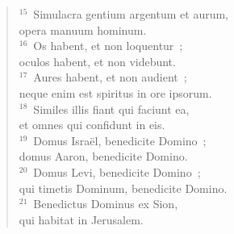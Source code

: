 \begin{flushleft}
\begin{verse}
${}^{15}$~Simulacra gentium argentum et aurum,\\ opera manuum hominum.\\
${}^{16}$~Os habent, et non loquentur~;\\ oculos habent, et non videbunt.\\
${}^{17}$~Aures habent, et non audient~;\\ neque enim est spiritus in ore ipsorum.\\
${}^{18}$~Similes illis fiant qui faciunt ea,\\ et omnes qui confidunt in eis.\\
${}^{19}$~Domus Isra\"el, benedicite Domino~;\\ domus Aaron, benedicite Domino.\\
${}^{20}$~Domus Levi, benedicite Domino~;\\ qui timetis Dominum, benedicite Domino.\\
${}^{21}$~Benedictus Dominus ex Sion,\\ qui habitat in Jerusalem.\end{verse}\end{flushleft}



